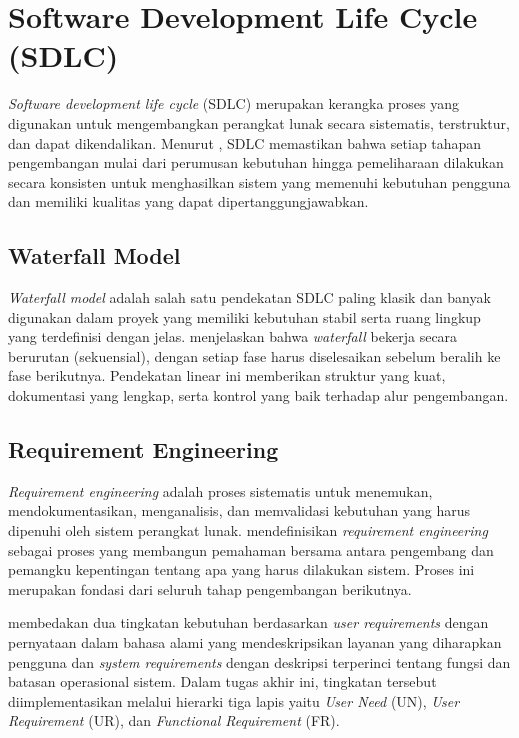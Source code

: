 \section{Software Development Life Cycle (SDLC)}

\emph{Software development life cycle} (SDLC) merupakan kerangka proses yang digunakan untuk mengembangkan perangkat lunak secara sistematis, terstruktur, dan dapat dikendalikan. Menurut \textcite{sommerville2016}, SDLC memastikan bahwa setiap tahapan pengembangan mulai dari perumusan kebutuhan hingga pemeliharaan dilakukan secara konsisten untuk menghasilkan sistem yang memenuhi kebutuhan pengguna dan memiliki kualitas yang dapat dipertanggungjawabkan.

\subsection{Waterfall Model}

\emph{Waterfall model} adalah salah satu pendekatan SDLC paling klasik dan banyak digunakan dalam proyek yang memiliki kebutuhan stabil serta ruang lingkup yang terdefinisi dengan jelas. \textcite{sommerville2016} menjelaskan bahwa \emph{waterfall} bekerja secara berurutan (sekuensial), dengan setiap fase harus diselesaikan sebelum beralih ke fase berikutnya. Pendekatan linear ini memberikan struktur yang kuat, dokumentasi yang lengkap, serta kontrol yang baik terhadap alur pengembangan.

\subsection{Requirement Engineering}

\emph{Requirement engineering} adalah proses sistematis untuk menemukan, mendokumentasikan, menganalisis, dan memvalidasi kebutuhan yang harus dipenuhi oleh sistem perangkat lunak. \textcite{sommerville2016} mendefinisikan \emph{requirement engineering} sebagai proses yang membangun pemahaman bersama antara pengembang dan pemangku kepentingan tentang apa yang harus dilakukan sistem. Proses ini merupakan fondasi dari seluruh tahap pengembangan berikutnya.

\textcite{sommerville2016} membedakan dua tingkatan kebutuhan berdasarkan \emph{user requirements} dengan pernyataan dalam bahasa alami yang mendeskripsikan layanan yang diharapkan pengguna dan \emph{system requirements} dengan deskripsi terperinci tentang fungsi dan batasan operasional sistem. Dalam tugas akhir ini, tingkatan tersebut diimplementasikan melalui hierarki tiga lapis yaitu \emph{User Need} (UN), \emph{User Requirement} (UR), dan \emph{Functional Requirement} (FR).


